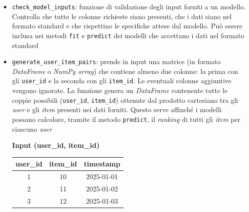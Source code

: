 \begin{itemize}
    \item \texttt{check\_model\_inputs}: funzione di validazione degli input forniti a un modello. Controlla che tutte le colonne richieste siano presenti, che i dati siano nel formato standard e che rispettino le specifiche attese dal modello. Può essere inclusa nei metodi \texttt{fit} e \texttt{predict} dei modelli che accettano i dati nel formato standard

    \item \texttt{generate\_user\_item\_pairs}: prende in input una matrice (in formato \textit{DataFrame} o \textit{NumPy array}) che contiene almeno due colonne: la prima con gli \texttt{user\_id} e la seconda con gli \texttt{item\_id}. Le eventuali colonne aggiuntive vengono ignorate. La funzione genera un \textit{DataFrame} contenente tutte le coppie possibili (\texttt{user\_id}, \texttt{item\_id}) ottenute dal prodotto cartesiano tra gli \textit{user} e gli \textit{item} presenti nei dati forniti. Questo serve affinché i modelli possano calcolare, tramite il metodo \texttt{predict}, il \textit{ranking} di tutti gli \textit{item} per ciascuno \textit{user}
    \begin{table}[H]
        \centering
        \begin{minipage}{\textwidth}
            \centering
            \textbf{Input (user\_id, item\_id)}\\[0.5em]
            \begin{tabular}{|c|c|c|}
            \hline
            \textbf{user\_id} & \textbf{item\_id} & \textbf{timestamp} \\
            \hline
            1 & 10 & 2025-01-01 \\
            2 & 11 & 2025-01-02 \\
            3 & 12 & 2025-01-03 \\
            \hline
            \end{tabular}
        \end{minipage}

        \vspace{1em} %


\end{table}
\end{itemize}
